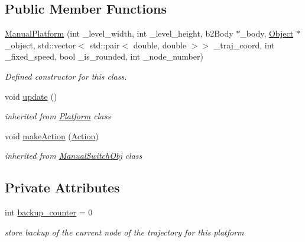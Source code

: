 \subsection*{Public Member Functions}
\begin{DoxyCompactItemize}
\item 
\hyperlink{class_manual_platform_a72aef4e3ecab2a802e09dfcc89e1f8e4}{Manual\+Platform} (int \+\_\+level\+\_\+width, int \+\_\+level\+\_\+height, b2\+Body $\ast$\+\_\+body, \hyperlink{class_object}{Object} $\ast$\+\_\+object, std\+::vector$<$ std\+::pair$<$ double, double $>$$>$ \+\_\+traj\+\_\+coord, int \+\_\+fixed\+\_\+speed, bool \+\_\+is\+\_\+rounded, int \+\_\+node\+\_\+number)
\begin{DoxyCompactList}\small\item\em Defined constructor for this class. \end{DoxyCompactList}\item 
\mbox{\label{class_manual_platform_ae77ccd8210c4ee32606b3475154325d4}} 
void \hyperlink{class_manual_platform_ae77ccd8210c4ee32606b3475154325d4}{update} ()
\begin{DoxyCompactList}\small\item\em inherited from \hyperlink{class_platform}{Platform} class \end{DoxyCompactList}\item 
\mbox{\label{class_manual_platform_ad7ae2aac108330a84246e3337fb5af81}} 
void \hyperlink{class_manual_platform_ad7ae2aac108330a84246e3337fb5af81}{make\+Action} (\hyperlink{_manual_switch_obj_8h_a8bb1ef53467e4f61410d12822d922498}{Action})
\begin{DoxyCompactList}\small\item\em inherited from \hyperlink{class_manual_switch_obj}{Manual\+Switch\+Obj} class \end{DoxyCompactList}\end{DoxyCompactItemize}
\subsection*{Private Attributes}
\begin{DoxyCompactItemize}
\item 
\mbox{\label{class_manual_platform_a8734cff028bd7e94fabc38be3f712534}} 
int \hyperlink{class_manual_platform_a8734cff028bd7e94fabc38be3f712534}{backup\+\_\+counter} = 0
\begin{DoxyCompactList}\small\item\em store backup of the current node of the trajectory for this platform \end{DoxyCompactList}\end{DoxyCompactItemize}
